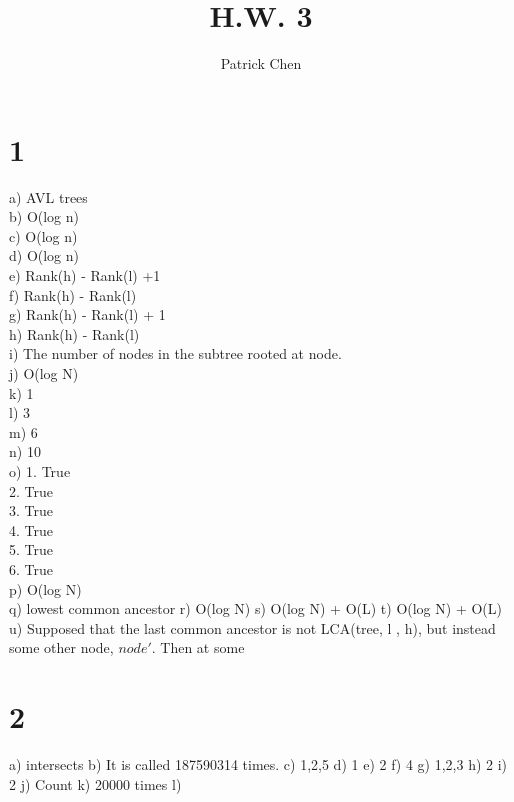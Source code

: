 \documentclass[10pt,a4paper]{article}
\title{H.W. 3}
\author{Patrick Chen}
\begin{document}
\maketitle
\tableofcontents
\section{1}
a) AVL trees \\
b) O(log n) \\
c) O(log n) \\
d) O(log n) \\
e) Rank(h) - Rank(l) +1 \\
f) Rank(h) - Rank(l) \\
g) Rank(h) - Rank(l) + 1 \\
h) Rank(h) - Rank(l) \\
i) The number of nodes in the subtree rooted at node.\\
j) O(log N)\\
k) 1\\
l) 3\\
m) 6\\
n) 10\\
o) 1. True\\
2. True\\
3. True\\
4. True\\
5. True\\
6. True\\
p) O(log N) \\
q) lowest common ancestor 
r) O(log N)
s) O(log N) + O(L)
t) O(log N) + O(L)
u) Supposed that the last common ancestor is not LCA(tree, l , h), but instead some other node, $node'$. Then at some 
\section{2}
a) intersects
b) It is called 187590314 times.
c) 1,2,5
d) 1
e) 2
f) 4
g) 1,2,3
h) 2
i) 2
j) Count
k) 20000 times
l)
\end{document}
